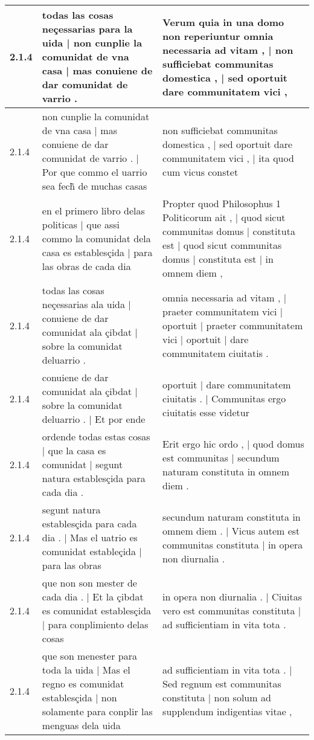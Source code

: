 \begin{tabular}{|p{1cm}|p{6.5cm}|p{6.5cm}|}
2.1.4 & todas las cosas neçessarias para la uida | non cunplie la comunidat de vna casa | mas conuiene de dar comunidat de varrio . & Verum quia in una domo non reperiuntur omnia necessaria ad vitam , | non sufficiebat communitas domestica , | sed oportuit dare communitatem vici , \\\hline
2.1.4 & non cunplie la comunidat de vna casa | mas conuiene de dar comunidat de varrio . | Por que commo el uarrio sea fech̃ de muchas casas & non sufficiebat communitas domestica , | sed oportuit dare communitatem vici , | ita quod cum vicus constet \\\hline
2.1.4 & en el primero libro delas politicas | que assi commo la comunidat dela casa es establesçida | para las obras de cada dia & Propter quod Philosophus 1 Politicorum ait , | quod sicut communitas domus | constituta est | quod sicut communitas domus | constituta est | in omnem diem , \\\hline
2.1.4 & todas las cosas neçessarias ala uida | conuiene de dar comunidat ala çibdat | sobre la comunidat deluarrio . & omnia necessaria ad vitam , | praeter communitatem vici | oportuit | praeter communitatem vici | oportuit | dare communitatem ciuitatis . \\\hline
2.1.4 & conuiene de dar comunidat ala çibdat | sobre la comunidat deluarrio . | Et por ende & oportuit | dare communitatem ciuitatis . | Communitas ergo ciuitatis esse videtur \\\hline
2.1.4 & ordende todas estas cosas | que la casa es comunidat | segunt natura establesçida para cada dia . & Erit ergo hic ordo , | quod domus est communitas | secundum naturam constituta in omnem diem . \\\hline
2.1.4 & segunt natura establesçida para cada dia . | Mas el uatrio es comunidat estableçida | para las obras & secundum naturam constituta in omnem diem . | Vicus autem est communitas constituta | in opera non diurnalia . \\\hline
2.1.4 & que non son mester de cada dia . | Et la çibdat es comunidat establesçida | para conplimiento delas cosas & in opera non diurnalia . | Ciuitas vero est communitas constituta | ad sufficientiam in vita tota . \\\hline
2.1.4 & que son menester para toda la uida | Mas el regno es comunidat establesçida | non solamente para conplir las menguas dela uida & ad sufficientiam in vita tota . | Sed regnum est communitas constituta | non solum ad supplendum indigentias vitae , \\\hline

\end{tabular}
